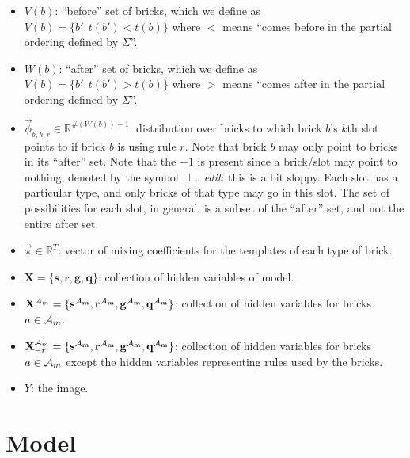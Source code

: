 \documentclass[11pt]{article}
\newcommand{\A}{{\cal A}}
\newcommand{\X}{\mathbf{X}}
\newcommand{\symb}{\Sigma}
\newcommand{\Xrm}{\X^{\Am}_{-r}}
\newcommand{\Am}{\A_{m}}
\newcommand{\Real}{\mathbb{R}}
\begin{document}
\begin{itemize}
\item $V(b)$: ``before'' set of bricks, which we define as $V(b) = \{b' : t(b') < t(b) \}$ where $<$ means ``comes before in the partial ordering defined by $\symb$''.

\item $W(b)$: ``after'' set of bricks, which we define as $V(b) = \{b' : t(b') > t(b) \}$ where $>$ means ``comes after in the partial ordering defined by $\symb$''.

\item $\vec{\phi}_{b,k,r} \in \mathbb{R}^{\#(W(b))+1}$: distribution over bricks to which brick $b$'s $k$th slot points to if brick $b$ is using rule $r$. Note that brick $b$ may only point to bricks in its ``after'' set. Note that the $+1$ is present since a brick/slot may point to nothing, denoted by the symbol $\perp$. \emph{edit}: this is a bit sloppy. Each slot has a particular type, and only bricks of that type may go in this slot. The set of possibilities for each slot, in general, is a subset of the ``after'' set, and not the entire after set.

\item $\vec{\pi} \in \Real^T$: vector of mixing coefficients for the templates of each type of brick.

\item $\X = \{ \mathbf{s}, \mathbf{r}, \mathbf{g}, \mathbf{q}\}$: collection of hidden variables of model.

\item $\X^{\Am} = \{ \mathbf{s^{\Am}}, \mathbf{r^{\Am}}, \mathbf{g^{\Am}}, \mathbf{q^{\Am}} \}$: collection of hidden variables for bricks $a \in \Am$.

\item $\Xrm = \{ \mathbf{s^{\Am}}, \mathbf{r^{\Am}}, \mathbf{g^{\Am}}, \mathbf{q^{\Am}} \}$: collection of hidden variables for bricks $a \in \Am$ except the hidden variables representing rules used by the bricks.

\item $Y$: the image.

\end{itemize}

\section{Model}
\end{document}
